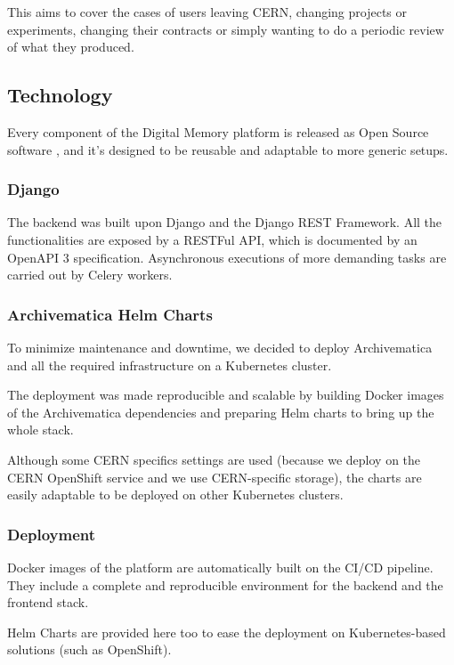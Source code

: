 \documentclass[11pt]{IEEEtran}
\begin{document}
This aims to cover the cases of users leaving CERN, changing projects or experiments, changing their contracts or simply wanting to do a periodic review of what they produced.

\subsection{Technology}

Every component of the Digital Memory platform is released as Open Source software \cite{CERNDigitalMemoryGitLab-2023-03-01}, and it’s designed to be reusable and adaptable to more generic setups.

\subsubsection{Django}

The backend was built upon Django and the Django REST Framework. All the functionalities are exposed by a RESTFul API, which is documented by an OpenAPI 3 specification. Asynchronous executions of more demanding tasks are carried out by Celery workers.

\subsubsection{Archivematica Helm Charts}

To minimize maintenance and downtime, we decided to deploy Archivematica and all the required infrastructure on a Kubernetes cluster.

The deployment was made reproducible and scalable by building Docker images of the Archivematica dependencies and preparing Helm charts \cite{archivematicak8s} to bring up the whole stack.

Although some CERN specifics settings are used (because we deploy on the CERN OpenShift service and we use CERN-specific storage), the charts are easily adaptable to be deployed on other Kubernetes clusters.

\subsubsection{Deployment}

Docker images of the platform are automatically built on the CI/CD pipeline. They include a complete and reproducible environment for the backend and the frontend stack.

Helm Charts are provided here too to ease the deployment on Kubernetes-based solutions (such as OpenShift).
\end{document}

